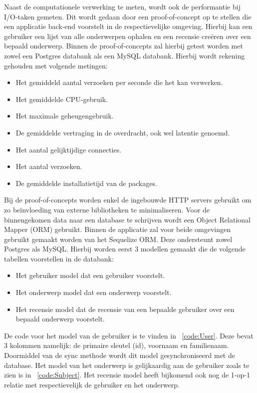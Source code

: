 Naast de computationele verwerking te meten, wordt ook de performantie bij I/O-taken gemeten.
Dit wordt gedaan door een proof-of-concept op te stellen die een applicatie back-end voorstelt in de respectievelijke omgeving.
Hierbij kan een gebruiker een lijst van alle onderwerpen ophalen en een recensie creëren over een bepaald onderwerp. 
Binnen de proof-of-concepts zal hierbij getest worden met zowel een Postgres databank als een MySQL databank.
Hierbij wordt rekening gehouden met volgende metingen:
\begin{itemize}
    \item Het gemiddeld aantal verzoeken per seconde die het kan verwerken.
    \item Het gemiddelde CPU-gebruik.
    \item Het maximale geheugengebruik.
    \item De gemiddelde vertraging in de overdracht, ook wel latentie genoemd.
    \item Het aantal gelijktijdige connecties.
    \item Het aantal verzoeken.
    \item De gemiddelde installatietijd van de packages.
\end{itemize}
Bij de proof-of-concepts worden enkel de ingebouwde HTTP servers gebruikt om zo beïnvloeding van externe bibliotheken te minimaliseren.
Voor de binnengekomen data naar een database te schrijven wordt een Object Relational Mapper (ORM) gebruikt.
Binnen de applicatie zal voor beide omgevingen gebruikt gemaakt worden van het Sequelize ORM. Deze ondersteunt zowel Postgres als MySQL.
Hierbij worden eerst 3 modellen gemaakt die de volgende tabellen voorstellen in de databank:
\begin{itemize}
  \item Het gebruiker model dat een gebruiker voorstelt.
  \item Het onderwerp model dat een onderwerp voorstelt.
  \item Het recensie model dat de recensie van een bepaalde gebruiker over een bepaald onderwerp voorstelt.
\end{itemize}
De code voor het model van de gebruiker is te vinden in ~\ref{code:User}. Deze bevat 3 kolommen namelijk: de primaire sleutel (id), voornaam en familienaam.
Doormiddel van de sync methode wordt dit model gesynchroniseerd met de database. 
Het model van het onderwerp is gelijkaardig aan de gebruiker zoals te zien is in ~\ref{code:Subject}. Het recensie model heeft bijkomend 
ook nog de 1-op-1 relatie met respectievelijk de gebruiker en het onderwerp.

